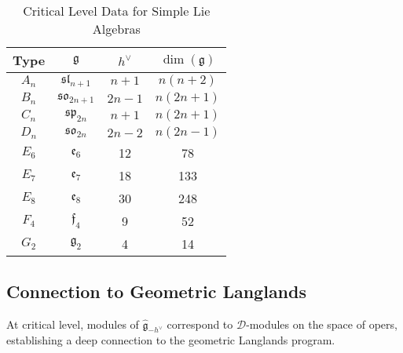 \begin{table}[H]
\centering
\caption{Critical Level Data for Simple Lie Algebras}
\begin{tabular}{|c|c|c|c|}
\hline
\textbf{Type} & $\mathfrak{g}$ & $h^{\vee}$ & $\dim(\mathfrak{g})$ \\
\hline
$A_n$ & $\mathfrak{sl}_{n+1}$ & $n+1$ & $n(n+2)$ \\
$B_n$ & $\mathfrak{so}_{2n+1}$ & $2n-1$ & $n(2n+1)$ \\
$C_n$ & $\mathfrak{sp}_{2n}$ & $n+1$ & $n(2n+1)$ \\
$D_n$ & $\mathfrak{so}_{2n}$ & $2n-2$ & $n(2n-1)$ \\
$E_6$ & $\mathfrak{e}_6$ & 12 & 78 \\
$E_7$ & $\mathfrak{e}_7$ & 18 & 133 \\
$E_8$ & $\mathfrak{e}_8$ & 30 & 248 \\
$F_4$ & $\mathfrak{f}_4$ & 9 & 52 \\
$G_2$ & $\mathfrak{g}_2$ & 4 & 14 \\
\hline
\end{tabular}
\end{table}

\subsection{Connection to Geometric Langlands}

\begin{remark}
At critical level, modules of $\widehat{\mathfrak{g}}_{-h^{\vee}}$ correspond to 
$\mathcal{D}$-modules on the space of opers, establishing a deep connection to the 
geometric Langlands program.
\end{remark}

